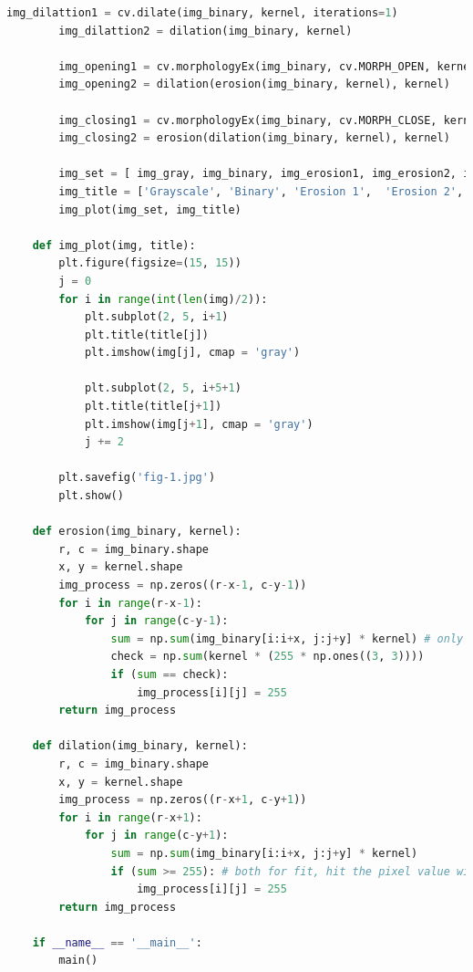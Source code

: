 \documentclass{article}
\begin{document}
{\begin{lstlisting}[language=Python, caption=Code for implementing different morphological operations as functions for a binary image]
        img_dilattion1 = cv.dilate(img_binary, kernel, iterations=1)
        img_dilattion2 = dilation(img_binary, kernel)
    
        img_opening1 = cv.morphologyEx(img_binary, cv.MORPH_OPEN, kernel)
        img_opening2 = dilation(erosion(img_binary, kernel), kernel)
    
        img_closing1 = cv.morphologyEx(img_binary, cv.MORPH_CLOSE, kernel)
        img_closing2 = erosion(dilation(img_binary, kernel), kernel)
    
        img_set = [ img_gray, img_binary, img_erosion1, img_erosion2, img_dilattion1, img_dilattion2, img_opening1, img_opening2, img_closing1, img_closing2]
        img_title = ['Grayscale', 'Binary', 'Erosion 1',  'Erosion 2', 'Dilation 1', 'Dilation 2', 'Opening 1', 'Opening 2', 'Closing 1', 'Closing 2']
        img_plot(img_set, img_title)
    
    def img_plot(img, title):
        plt.figure(figsize=(15, 15))
        j = 0
        for i in range(int(len(img)/2)):
            plt.subplot(2, 5, i+1)
            plt.title(title[j])
            plt.imshow(img[j], cmap = 'gray')
            
            plt.subplot(2, 5, i+5+1)
            plt.title(title[j+1])
            plt.imshow(img[j+1], cmap = 'gray')
            j += 2
    
        plt.savefig('fig-1.jpg')
        plt.show()
    
    def erosion(img_binary, kernel):
        r, c = img_binary.shape
        x, y = kernel.shape
        img_process = np.zeros((r-x-1, c-y-1))
        for i in range(r-x-1):
            for j in range(c-y-1):
                sum = np.sum(img_binary[i:i+x, j:j+y] * kernel) # only for fit, the pixel value will be 1
                check = np.sum(kernel * (255 * np.ones((3, 3))))
                if (sum == check):
                    img_process[i][j] = 255
        return img_process
    
    def dilation(img_binary, kernel):
        r, c = img_binary.shape
        x, y = kernel.shape
        img_process = np.zeros((r-x+1, c-y+1))
        for i in range(r-x+1):
            for j in range(c-y+1):
                sum = np.sum(img_binary[i:i+x, j:j+y] * kernel) 
                if (sum >= 255): # both for fit, hit the pixel value will be 1
                    img_process[i][j] = 255
        return img_process
    
    if __name__ == '__main__':
        main()

    \end{lstlisting}
    \\
    
}
\end{document}
